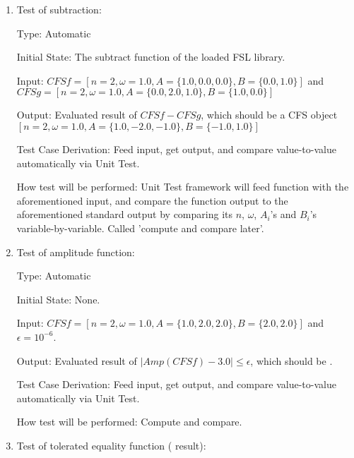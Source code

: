 \documentclass[12pt, titlepage]{article}
\begin{document}
\begin{enumerate}
	
	\item{Test of subtraction: \\}
	
	Type: Automatic
	
	Initial State: The subtract function of the loaded FSL library.
	
	Input: $\mathit{CFSf}=[n=2, \omega=1.0, A=\{1.0, 0.0, 0.0\}, B=\{0.0, 1.0\}]$ and 
	$\mathit{CFSg}=[n=2, \omega=1.0, A=\{0.0, 2.0, 1.0\}, B=\{1.0, 0.0\}]$	 
	
	Output: Evaluated result of $\mathit{CFSf}-\mathit{CFSg}$, which should
        be a CFS object
        $[n=2, \omega=1.0, A=\{1.0, -2.0, -1.0\}, B=\{-1.0, 1.0\}]$
	
	Test Case Derivation: Feed input, get output, and compare value-to-value automatically via Unit Test. 
	
	How test will be performed: Unit Test framework will feed function with the aforementioned input,
        and compare the function output to the aforementioned standard output by
        comparing its $n$, $\omega$, $A_i$'s and $B_i$'s variable-by-variable. Called 'compute and compare later'.
	
	\item{Test of amplitude function: \\}					
	
	Type: Automatic
	
	Initial State: None.
	
	Input: $\mathit{CFSf}=[n=2, \omega=1.0, A=\{1.0, 2.0, 2.0\}, B=\{2.0,
        2.0\}]$ and $\epsilon=10^{-6}$.
	
	Output: Evaluated result of
        $|\mathit{Amp}(\mathit{CFSf})-3.0|\leq\epsilon$, which should be
        .
	
	Test Case Derivation: Feed input, get output, and compare value-to-value automatically via Unit Test.
	
	How test will be performed: Compute and compare.
	
	
	\item{Test of tolerated equality function  ( result): \\}
	

\end{enumerate}
\end{document}
